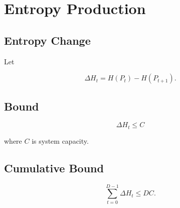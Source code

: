 \chapter{Entropy Production}

\section{Entropy Change}

Let

\[
\Delta H_t = H(P_t) - H(P_{t+1}).
\]

\section{Bound}

\[
\Delta H_t \le C
\]

where \(C\) is system capacity.

\section{Cumulative Bound}

\[
\sum_{t=0}^{D-1} \Delta H_t \le D C.
\]

